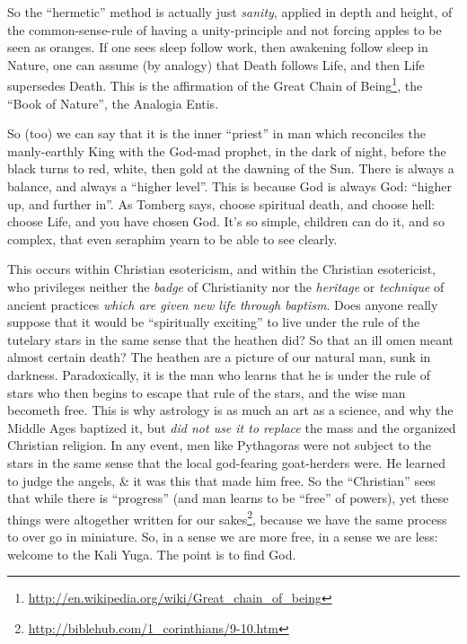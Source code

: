 So the ``hermetic'' method is actually just \emph{sanity}, applied in depth and height, of the common-sense-rule of having a unity-principle and not forcing apples to be seen as oranges. If one sees sleep follow work, then awakening follow sleep in Nature, one can assume (by analogy) that Death follows Life, and then Life supersedes Death. This is the affirmation of the Great Chain of Being\footnote{\url{http://en.wikipedia.org/wiki/Great_chain_of_being}}, the ``Book of Nature'', the Analogia Entis.

So (too) we can say that it is the inner ``priest'' in man which reconciles the manly-earthly King with the God-mad prophet, in the dark of night, before the black turns to red, white, then gold at the dawning of the Sun. There is always a balance, and always a ``higher level''. This is because God is always God: ``higher up, and further in''. As Tomberg says, choose spiritual death, and choose hell: choose Life, and you have chosen God. It's so simple, children can do it, and so complex, that even seraphim yearn to be able to see clearly.

This occurs within Christian esotericism, and within the Christian esotericist, who privileges neither the \emph{badge} of Christianity nor the \emph{heritage} or \emph{technique} of ancient practices \emph{which are given new life through baptism}. Does anyone really suppose that it would be ``spiritually exciting'' to live under the rule of the tutelary stars in the same sense that the heathen did? So that an ill omen meant almost certain death? The heathen are a picture of our natural man, sunk in darkness. Paradoxically, it is the man who learns that he is under the rule of stars who then begins to escape that rule of the stars, and the wise man becometh free. This is why astrology is as much an art as a science, and why the Middle Ages baptized it, but \emph{did not use it to replace} the mass and the organized Christian religion. In any event, men like Pythagoras were not subject to the stars in the same sense that the local god-fearing goat-herders were. He learned to judge the angels, \& it was this that made him free. So the ``Christian'' sees that while there is ``progress'' (and man learns to be ``free'' of powers), yet these things were altogether written for our sakes\footnote{\url{http://biblehub.com/1_corinthians/9-10.htm}}, because we have the same process to over go in miniature. So, in a sense we are more free, in a sense we are less: welcome to the Kali Yuga. The point is to find God.

